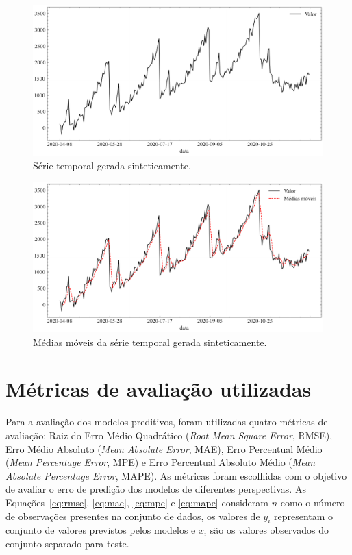 \begin{figure}[!htp]
    \centering
    \includegraphics[width=5.0in]{img/dados_sinteticos.pdf}
    \caption{Série temporal gerada sinteticamente.}\label{fig:dados_sinteticos}
\end{figure}


\begin{figure}[!htp]
    \centering
    \includegraphics[width=5.0in]{img/dados_sinteticos_ma.pdf}
    \caption{Médias móveis da série temporal gerada sinteticamente.}\label{fig:dados_sinteticos_ma}
\end{figure}

\FloatBarrier

\section{Métricas de avaliação utilizadas}\label{sec:metrics}
Para a avaliação dos modelos preditivos, foram utilizadas quatro métricas de avaliação:  Raiz do Erro Médio Quadrático (\textit{Root Mean Square Error}, RMSE), Erro Médio Absoluto (\textit{Mean Absolute Error}, MAE), Erro Percentual Médio (\textit{Mean Percentage Error}, MPE) e Erro Percentual Absoluto Médio (\textit{Mean Absolute Percentage Error}, MAPE). As métricas foram escolhidas com o objetivo de avaliar o erro de predição dos modelos de diferentes perspectivas. As Equações~\ref{eq:rmse}, \ref{eq:mae}, \ref{eq:mpe} e \ref{eq:mape} consideram $n$ como o número de observações presentes na conjunto de dados, os valores de $y_{i}$ representam o conjunto de valores previstos pelos modelos e $x_{i}$ são os valores observados do conjunto separado para teste.

